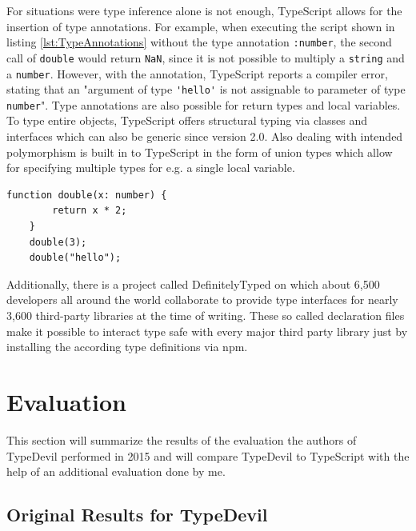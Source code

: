 \documentclass[runningheads,a4paper]{llncs}
\begin{document}
For situations were type inference alone is not enough, TypeScript allows for the insertion of type annotations.
For example, when executing the script shown in listing \ref{lst:TypeAnnotations} without the type annotation \lstinline[columns=fixed]{:number}, the second call of \lstinline[columns=fixed]{double} would return \lstinline[columns=fixed]{NaN}, since it is not possible to multiply a \lstinline[columns=fixed]{string} and a \lstinline[columns=fixed]{number}.
However, with the annotation, TypeScript reports a compiler error, stating that an "argument of type \lstinline[columns=fixed]{'hello'} is not assignable to parameter of type \lstinline[columns=fixed]{number}".
Type annotations are also possible for return types and local variables.
To type entire objects, TypeScript offers structural typing via classes and interfaces which can also be generic since version 2.0.
Also dealing with intended polymorphism is built in to TypeScript in the form of union types which allow for specifying multiple types for e.g. a single local variable.

\medskip\medskip
\lstset{language=javascript}
\begin{minipage}{\linewidth}
\begin{lstlisting}[frame=single, caption=Type Annotations, label={lst:TypeAnnotations}]
    function double(x: number) {
        return x * 2;
    }
    double(3);
    double("hello");
\end{lstlisting}
\end{minipage}

Additionally, there is a project called DefinitelyTyped \cite{DefinitelyTyped} on which about 6,500 developers all around the world collaborate to provide type interfaces for nearly 3,600 third-party libraries at the time of writing.
These so called declaration files make it possible to interact type safe with every major third party library just by installing the according type definitions via npm.

\section{Evaluation}

This section will summarize the results of the evaluation the authors of TypeDevil performed in 2015 and will compare TypeDevil to TypeScript with the help of an additional evaluation done by me.

\subsection{Original Results for TypeDevil}
\end{document}
